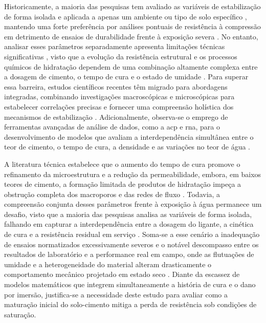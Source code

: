 
Historicamente, a maioria das pesquisas tem avaliado as variáveis de estabilização de forma isolada e aplicada a apenas um ambiente ou tipo de solo específico , mantendo uma forte preferência por análises pontuais de resistência à compressão em detrimento de ensaios de durabilidade frente à exposição severa \cite{Khunaprapakorn2025, Junior2024}. No entanto, analisar esses parâmetros separadamente apresenta limitações técnicas significativas , visto que a evolução da resistência estrutural e os processos químicos de hidratação dependem de uma combinação altamente complexa entre a dosagem de cimento, o tempo de cura e o estado de umidade \cite{Abdallah2023}. Para superar essa barreira, estudos científicos recentes têm migrado para abordagens integradas, combinando investigações macroscópicas e microscópicas para estabelecer correlações precisas e fornecer uma compreensão holística dos mecanismos de estabilização \cite{Yang2024}. Adicionalmente, observa-se o emprego de ferramentas avançadas de análise de dados, como a \gls{acp}  e \gls{rna}, para o desenvolvimento de modelos que avaliam a interdependência simultânea entre o teor de cimento, o tempo de cura, a densidade e as variações no teor de água \cite{Abdallah2023}.


A literatura técnica estabelece que o aumento do tempo de cura promove o refinamento da microestrutura e a redução da permeabilidade, embora, em baixos teores de cimento, a formação limitada de produtos de hidratação impeça a obstrução completa dos macroporos e das redes de fluxo \cite{Javed2025}. Todavia, a compreensão conjunta desses parâmetros frente à exposição à água permanece um desafio, visto que a maioria das pesquisas analisa as variáveis de forma isolada, falhando em capturar a interdependência entre a dosagem do ligante, a cinética de cura e a resistência residual em serviço \cite{Abdallah2023, Pham2022, Giada2019, Morel2021}. Soma-se a esse cenário a inadequação de ensaios normatizados excessivamente severos e o notável descompasso entre os resultados de laboratório e a performance real em campo, onde as flutuações de umidade e a heterogeneidade do material alteram drasticamente o comportamento mecânico projetado em estado seco \cite{Traore2021, Tarham2024, Giada2019, Khunaprapakorn2025, Morel2021}. Diante da escassez de modelos matemáticos que integrem simultaneamente a história de cura e o dano por imersão, justifica-se a necessidade deste estudo para avaliar como a maturação inicial do solo-cimento mitiga a perda de resistência sob condições de saturação.

